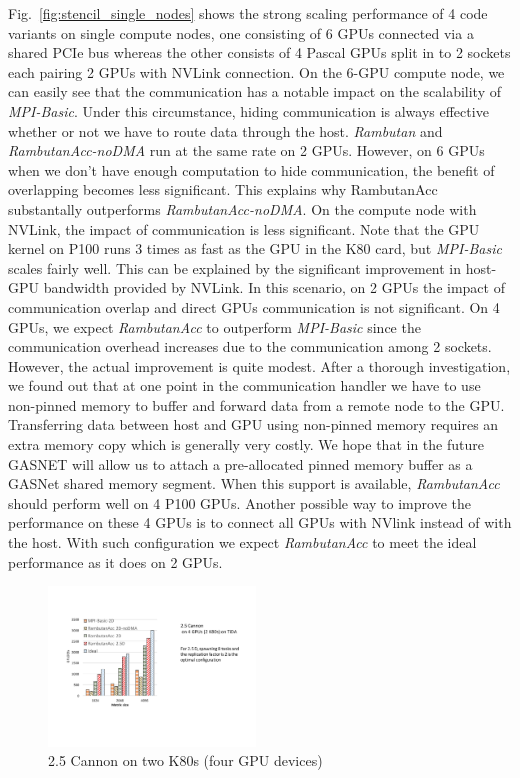 Fig.~\ref{fig:stencil_single_nodes} shows the strong scaling performance of 4 code variants on single compute nodes, one consisting of 6 GPUs connected via a shared PCIe bus whereas the other consists of 4 Pascal GPUs split in to 2 sockets each pairing 2 GPUs with NVLink connection. 
On the 6-GPU compute node, we can easily see that the communication has a notable impact on the scalability of {\em MPI-Basic}.
Under this circumstance, hiding communication is always effective whether or not we have to route data through the host.
{\em Rambutan} and {\em RambutanAcc-noDMA} run at the same rate on 2 GPUs.
However, on 6 GPUs when we don't have enough computation to hide communication, the benefit of overlapping becomes less significant.
This explains why RambutanAcc substantally outperforms {\em RambutanAcc-noDMA}.
On the compute node with NVLink, the impact of communication is less significant.
Note that the GPU kernel on P100 runs 3 times as fast as the GPU in the K80 card, but {\em MPI-Basic} scales fairly well.
This can be explained by the significant improvement in host-GPU bandwidth provided by NVLink.
In this scenario, on 2 GPUs the impact of communication overlap and direct GPUs communication is not significant.
On 4 GPUs, we expect {\em RambutanAcc} to outperform {\em MPI-Basic} since the communication overhead increases due to the communication among 2 sockets.
However, the actual improvement is quite modest.
After a thorough investigation, we found out that at one point in the communication handler we have to use non-pinned memory to buffer and forward data from a remote node to the GPU.
Transferring data between host and GPU using non-pinned memory requires an extra memory copy which is generally very costly.
We hope that in the future GASNET will allow us to attach a pre-allocated pinned memory buffer as a GASNet shared memory segment.
When this support is available, {\em RambutanAcc} should perform well on 4 P100 GPUs.
Another possible way to improve the performance on these 4 GPUs is to connect all GPUs with NVlink instead of with the host.
With such configuration we expect {\em RambutanAcc} to meet the ideal performance as it does on 2 GPUs.




\begin{figure}[htb]
\centering
\includegraphics[width=0.49\textwidth]{figures/cannon_tida.pdf}
\caption{2.5 Cannon on two K80s (four GPU devices)}
\label{cannon_onnode}
\end{figure}



